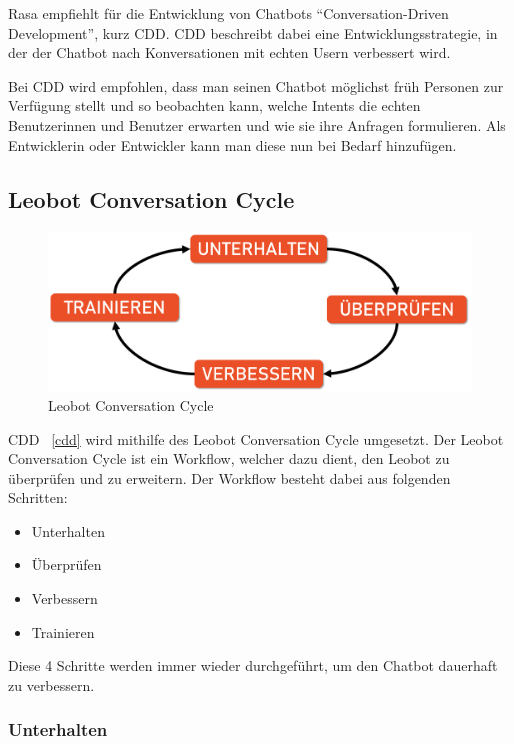 Rasa empfiehlt für die Entwicklung von Chatbots ``Conversation-Driven Development'', kurz CDD.\cite{cdd}
CDD beschreibt dabei eine Entwicklungsstrategie, in der der Chatbot nach Konversationen mit echten Usern verbessert wird.

Bei CDD wird empfohlen, dass man seinen Chatbot möglichst früh Personen zur Verfügung stellt und so beobachten kann, welche Intents die echten Benutzerinnen und Benutzer erwarten und wie sie ihre Anfragen formulieren.
Als Entwicklerin oder Entwickler kann man diese nun bei Bedarf hinzufügen.


\subsection{Leobot Conversation Cycle}\label{subsec:leobot-conversation-cycle}

\begin{figure}[hbt!]
    \centering
    \includegraphics[scale=0.2]{pics/LeoCircle}
    \caption{Leobot Conversation Cycle}
    \label{fig:impl:ConversationCycle}
\end{figure}

CDD ~\ref{cdd} wird mithilfe des Leobot Conversation Cycle umgesetzt.
Der Leobot Conversation Cycle ist ein Workflow, welcher dazu dient, den Leobot zu überprüfen und zu erweitern.
Der Workflow besteht dabei aus folgenden Schritten:

\begin{itemize}
    \item Unterhalten
    \item Überprüfen
    \item Verbessern
    \item Trainieren
\end{itemize}

Diese 4 Schritte werden immer wieder durchgeführt, um den Chatbot dauerhaft zu verbessern.

\subsubsection{Unterhalten}


